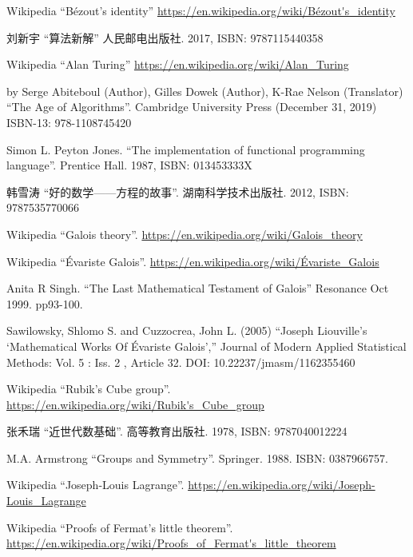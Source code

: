 \documentclass{article}
\begin{document}
\begin{thebibliography}{99}
Wikipedia ``Bézout's identity'' \url{https://en.wikipedia.org/wiki/Bézout's_identity}

{\fontspec{\cnmainft}刘新宇 ``算法新解'' 人民邮电出版社. 2017, ISBN: 9787115440358}

Wikipedia ``Alan Turing'' \url{https://en.wikipedia.org/wiki/Alan_Turing}

by Serge Abiteboul (Author), Gilles Dowek (Author), K-Rae Nelson (Translator) ``The Age of Algorithms''. Cambridge University Press (December 31, 2019) ISBN-13: 978-1108745420

Simon L. Peyton Jones. ``The implementation of functional programming language''. Prentice Hall. 1987, ISBN: 013453333X


{\fontspec{\cnmainft}韩雪涛 ``好的数学——方程的故事''. 湖南科学技术出版社.} 2012, ISBN: 9787535770066

Wikipedia ``Galois theory''. \url{https://en.wikipedia.org/wiki/Galois_theory}

Wikipedia ``Évariste Galois''. \url{https://en.wikipedia.org/wiki/Évariste_Galois}

Anita R Singh. ``The Last Mathematical Testament of Galois'' Resonance Oct 1999. pp93-100.

Sawilowsky, Shlomo S. and Cuzzocrea, John L. (2005) ``Joseph Liouville’s `Mathematical Works Of Évariste Galois','' Journal of Modern Applied Statistical Methods: Vol. 5 : Iss. 2 , Article 32. DOI: 10.22237/jmasm/1162355460

Wikipedia ``Rubik's Cube group''. \url{https://en.wikipedia.org/wiki/Rubik's_Cube_group}

{\fontspec{\cnmainft}张禾瑞 ``近世代数基础''. 高等教育出版社.} 1978, ISBN: 9787040012224

M.A. Armstrong ``Groups and Symmetry''. Springer. 1988. ISBN: 0387966757.

Wikipedia ``Joseph-Louis Lagrange''. \url{https://en.wikipedia.org/wiki/Joseph-Louis_Lagrange}

Wikipedia ``Proofs of Fermat's little theorem''. \url{https://en.wikipedia.org/wiki/Proofs_of_Fermat's_little_theorem}


\end{thebibliography}
\end{document}
